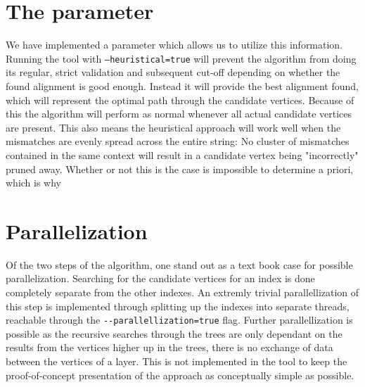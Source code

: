\documentclass[thesis.tex]{subfiles}
\begin{document}
\section{The  parameter}
\label{sec:implementation_heuristic}
We have implemented a parameter which allows us to utilize this information. Running the tool with \texttt{--heuristical=true} will prevent the algorithm from doing its regular, strict validation and subsequent cut-off depending on whether the found alignment is good enough. Instead it will provide the best alignment found, which will represent the optimal path through the candidate vertices. Because of this the algorithm will perform as normal whenever all actual candidate vertices are present. This also means the heuristical approach will work well when the mismatches are evenly spread across the entire string: No cluster of mismatches contained in the same context will result in a candidate vertex being "incorrectly" pruned away. Whether or not this is the case is impossible to determine a priori, which is why 
\section{Parallelization}
Of the two steps of the algorithm, one stand out as a text book case for possible parallelization. Searching for the candidate vertices for an index is done completely separate from the other indexes. An extremly trivial parallellization of this step is implemented through splitting up the indexes into separate threads, reachable through the \texttt{-{}-parallellization=true} flag. Further parallellization is possible as the recursive searches through the trees are only dependant on the results from the vertices higher up in the trees, there is no exchange of data between the vertices of a layer. This is not implemented in the tool to keep the proof-of-concept presentation of the approach as conceptually simple as possible.
\clearpage
\end{document}

